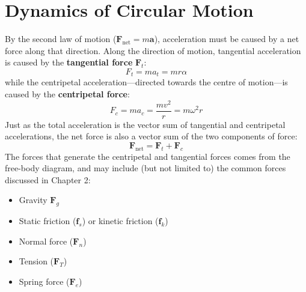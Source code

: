 \section{Dynamics of Circular Motion}
By the second law of motion ($\bm F_\text{net}=m\bm a$), acceleration must
be caused by a net force along that direction. Along the direction of motion,
tangential acceleration is caused by the \textbf{tangential force}
$\bm F_t$:
\begin{equation}
  \boxed{
    F_t=ma_t=mr\alpha %
  }
\end{equation}
while the centripetal acceleration---directed towards the centre of motion---is
caused by the \textbf{centripetal force}:
\begin{equation}
  \boxed{
    F_c
    =ma_c
    =\frac{mv^2}r%
    =m\omega^2r %
  }
\end{equation}
Just as the total acceleration is the vector sum of tangential and centripetal
accelerations, the net force is also a vector sum of the two components of
force:
\begin{equation}
  \boxed{
    \bm F_\text{net}=\bm F_t + \bm F_c
  }
\end{equation}
The forces that generate the centripetal and tangential forces comes from the
free-body diagram, and may include (but not limited to) the common forces
discussed in Chapter 2:
\begin{itemize}
\item Gravity $\bm F_g$
\item Static friction ($\bm f_s$) or kinetic friction ($\bm f_k$)
\item Normal force ($\bm F_n$)
\item Tension ($\bm F_T$)
\item Spring force ($\bm F_e$)
\end{itemize}




